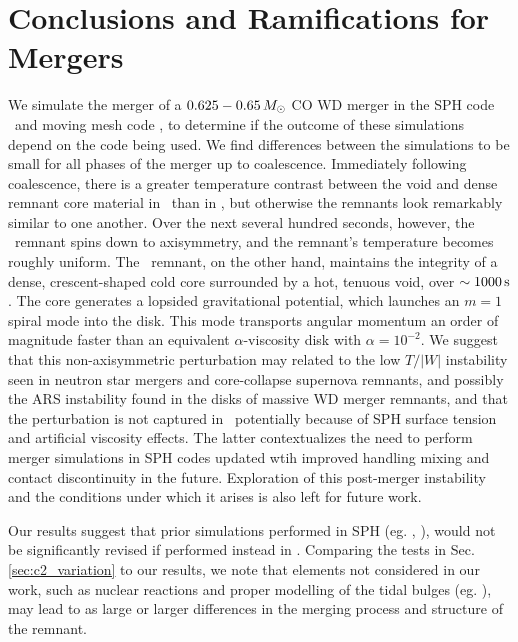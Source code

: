 \section{Conclusions and Ramifications for Mergers}
\label{sec:c3_conclusion}

We simulate the merger of a $0.625-0.65\,\Msun$ CO WD merger in the SPH code \gasoline\ and moving mesh code \arepo, to determine if the outcome of these simulations depend on the code being used.  We find differences between the simulations to be small for all phases of the merger up to coalescence.  Immediately following coalescence, there is a greater temperature contrast between the void and dense remnant core material in \arepo\ than in \gasoline, but otherwise the remnants look remarkably similar to one another.  Over the next several hundred seconds, however, the \gasoline\ remnant spins down to axisymmetry, and the remnant's temperature becomes roughly uniform.  The \arepo\ remnant, on the other hand, maintains the integrity of a dense, crescent-shaped cold core surrounded by a hot, tenuous void, over $\sim1000\,\mathrm{s}$.  The core generates a lopsided gravitational potential, which launches an $m = 1$ spiral mode into the disk.  This mode transports angular momentum an order of magnitude faster than an equivalent $\alpha$-viscosity disk with $\alpha = 10^{-2}$.  We suggest that this non-axisymmetric perturbation may related to the low $T/|W|$ instability seen in neutron star mergers and core-collapse supernova remnants, and possibly the ARS instability found in the disks of massive WD merger remnants, and that the perturbation is not captured in \gasoline\ potentially because of SPH surface tension and artificial viscosity effects.  The latter contextualizes the need to perform merger simulations in SPH codes updated wtih improved handling mixing and contact discontinuity in the future.  Exploration of this post-merger instability and the conditions under which it arises is also left for future work.

Our results suggest that prior simulations performed in SPH (eg. \citeal{loreig09}, \citeal{zhu+13}), would not be significantly revised if performed instead in \arepo.  Comparing the tests in Sec. \ref{sec:c2_variation} to our results, we note that elements not considered in our work, such as nuclear reactions and proper modelling of the tidal bulges (eg. \citealt{dan+11}), may lead to as large or larger differences in the merging process and structure of the remnant.  


